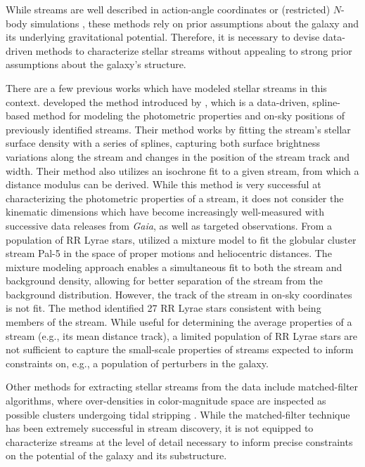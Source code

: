 \documentclass[twocolumn]{aastex631}
\newcommand{\dataarchive}[1]{\textit{#1}}
\newcommand{\Gaia}{\dataarchive{Gaia}}
\begin{document}
    While streams are well described in action-angle coordinates
    \citep[e.g.][]{Bovy2014} or (restricted) $N$-body simulations
    \citep[e.g.][]{Dehnen+2004}, these methods rely on prior assumptions about
    the galaxy and its underlying gravitational potential. Therefore, it is
    necessary to devise data-driven methods to characterize stellar streams
    without appealing to strong prior assumptions about the galaxy's structure. 
    
    There are a few previous works which have modeled stellar streams in this
    context. \citet{Patrick+2022} developed the method introduced by
    \citet{Erkal+2017}, which is a data-driven, spline-based method for modeling
    the photometric properties and on-sky positions of previously identified
    streams. Their method works by fitting the stream's stellar surface density
    with a series of splines, capturing both surface brightness variations along
    the stream and changes in the position of the stream track and width. Their
    method also utilizes an isochrone fit to a given stream, from which a
    distance modulus can be derived. While this method is very successful at
    characterizing the photometric properties of a stream, it does not consider
    the kinematic dimensions which have become increasingly well-measured with
    successive data releases from \Gaia{}, as well as targeted observations.
    From a population of RR Lyrae stars, \citet{Price-Whelan+2019} utilized a
    mixture model to fit the globular cluster stream Pal-5 in the space of
    proper motions and heliocentric distances. The mixture modeling approach
    enables a simultaneous fit to both the stream and background density,
    allowing for better separation of the stream from the background
    distribution. However, the track of the stream in on-sky coordinates is not
    fit. The method identified 27 RR Lyrae stars consistent with being members
    of the stream. While useful for determining the average properties of a
    stream (e.g., its mean distance track), a limited population of RR Lyrae
    stars are not sufficient to capture the small-scale properties of streams
    expected to inform constraints on, e.g., a population of perturbers in the
    galaxy.

    Other methods for extracting stellar streams from the data include
    matched-filter algorithms, where over-densities in color-magnitude space are
    inspected as possible clusters undergoing tidal stripping
    \citep{Grillmair+1995, GrillmairJohnson2006, Shipp+2018}. While the
    matched-filter technique has been extremely successful in stream discovery,
    it is not equipped to characterize streams at the level of detail necessary
    to inform precise constraints on the potential of the galaxy and its
    substructure.
\end{document}
